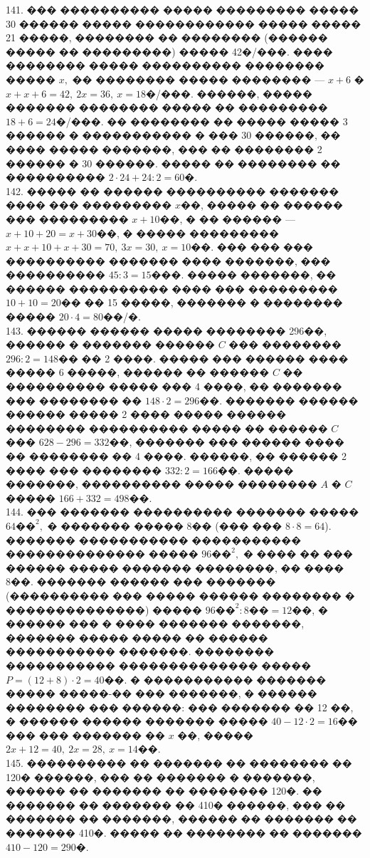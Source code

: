 \documentclass[12pt]{article}
\begin{document}
141. ��� ���������� ����� ��������� ����� 30 ������ ����� ������������ ����� ����� 21 �����, �������� �� �������� (������ ����� �� ���������) ����� 42�/���. ���� �������� ����� ���������� �������� ����� $x,$ �� �������� ����� �������� --- $x+6$ � $x+x+6=42,\ 2x=36,\ x=18$�/���. ������, ����� ������� �������� ����� �� ��������� $18+6=24$�/���. �� �������� �� ����� ����� 3 ������ � ����������� � ��� 30 ������, �� ���� ����� �������, ��� �� �������� 2 ������ � 30 ������. ����� �� �������� �� ���������� $2\cdot24+24:2=60$�.\\
142. ����� �� ������ ���������� ������� ���� ��� ��������� $x$��, ����� �� ������ ��� ��������� $x+10$��, � �� ������ --- $x+10+20=x+30$��, � ����� ��������� $x+x+10+x+30=70,\ 3x=30,\ x=10$��. ��� ��� ��� ���������� ������� ���� �������, ��� ���������� $45:3=15$���. ����� �������, �� ������ ���������� ���� ��� ��������� $10+10=20$�� �� 15 �����, ������� � �������� ����� $20\cdot4=80$��/�.\\
143. ������ ������ ����� �������� 296��, ������ � ������� ������ $C$ ��� �������� $296:2=148$�� �� 2 ����. ����� ��� ������ ���� ����� 6 �����, ������ �� ������ $C$ �� ���������� ����� ��� 4 ����, �� ������� ��� �������� �� $148\cdot2=296$��. ������� ������ ������ ����� 2 ���� ����� ������ �������� ���������� ����� �� ������ $C$ ��� $628-296=332$��, ������� ��� ������ ���� �� �������� �� 4 ����. ������, �� ������ 2 ���� ��� �������� $332:2=166$��. ����� �������, ���������� ����� �������� $A$ � $C$ ����� $166+332=498$��.\\
144. ��� ������� ���������� ������� ����� $64\text{��}^2,$ � ������� ����� 8�� (��� ��� $8\cdot8=64$). ������� ����������� ����������� �������������� ����� $96\text{��}^2,$ � ���� �� ��� ������ ����� ������� ��������, �� ���� 8��. ������� ������ ��� ������� (���������� ��� ����� ������ �������� � ��������������) ����� $96\text{��}^2:8\text{��}=12$��, � ������ ��� � ���� ������� �������, ������� ����� ����� �� ������ ����������� �������. �������� ����������� �������������� ����� $P=(12+8)\cdot2=40$��. � ����������� ������� ����� �����-�� ��� �������, � ������ �������� ��� ������: ��� ������� �� 12 ��, � ������ ������ ������� ����� $40-12\cdot2=16$�� ��� ��� ������� �� $x$ ��, ����� $2x+12=40,\ 2x=28,\ x=14$��.\\
145. ���������� �� ������� �� �������� �� 120� ������, ��� �� ������� � �������, ������ �� ������� �� �������� 120�. �� ������� �� ������� �� 410� ������, ��� �� ������� �� �������, ������ �� ������� �� ������� 410�. ����� �� �������� �� ������� $410-120=290$�.\\
\end{document}
